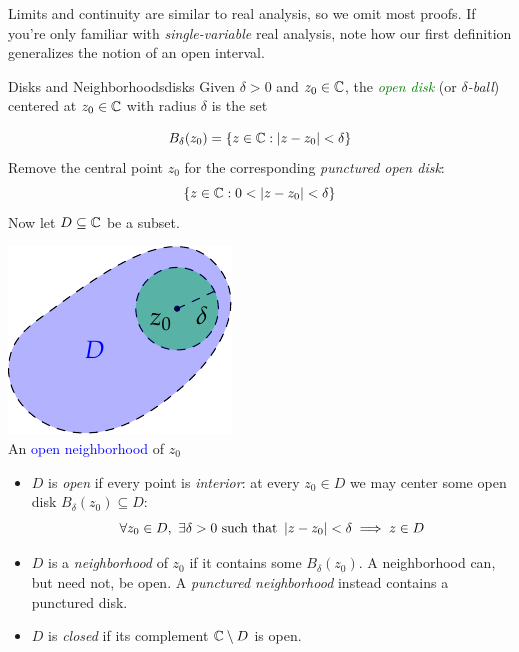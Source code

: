 Limits and continuity are similar to real analysis, so we omit most proofs. If you're only familiar with \emph{single-variable} real analysis, note how our first definition generalizes the notion of an open interval.


\begin{defn}{Disks and Neighborhoods}{disks}
	Given $\delta>0$ and $z_0\in\mathbb{C}$, the \emph{\textcolor{Green}{open disk}} (or \emph{$\delta$-ball}) centered at $z_0\in\mathbb{C}$ with radius $\delta$ is the set\par
	\begin{minipage}[t]{0.7\linewidth}\vspace{-15pt}
		\[
			B_\delta(z_0)=\{z\in\mathbb{C}:\left| z-z_0\right|<\delta\}
		\]
		Remove the central point $z_0$ for the corresponding \emph{punctured open disk}:
		\[
			\{z\in\mathbb{C}:0<\left| z-z_0\right|<\delta\}
		\]
		Now let $D\subseteq\mathbb{C}$ be a subset.
	\end{minipage}
	\hfill
	\begin{minipage}[t]{0.29\linewidth}\vspace{-16pt}
		\centering%
		\includegraphics[scale=0.95]{functions-open}\\
		An \textcolor{blue}{open neighborhood} of $z_0$
	\end{minipage}
	\par\vspace{-5pt}
	\begin{itemize}\itemsep0pt
		\item $D$ is \emph{open} if every point is \emph{interior}: at every $z_0\in D$ we may center some open disk $B_\delta(z_0)\subseteq D$:
		\[
			\forall z_0\in D, \ \exists \delta>0\text{ such that } \left| z-z_0\right|<\delta\implies z\in D
		\]\vspace{-18pt}
		\item $D$ is a \emph{neighborhood} of $z_0$ if it contains some $B_\delta(z_0)$. A neighborhood can, but need not, be open. A \emph{punctured neighborhood} instead contains a punctured disk.
		\item $D$ is \emph{closed} if its complement $\mathbb{C}\setminus D$ is open.
	\end{itemize}
\end{defn}

